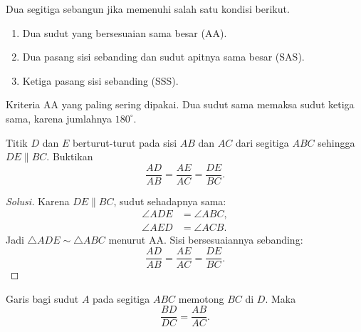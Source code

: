 \documentclass[12pt]{scrartcl}
\begin{document}
\begin{fact}
Dua segitiga sebangun jika memenuhi salah satu kondisi berikut.
\begin{enumerate}
    \item Dua sudut yang bersesuaian sama besar (AA).
    \item Dua pasang sisi sebanding dan sudut apitnya sama besar (SAS).
    \item Ketiga pasang sisi sebanding (SSS).
\end{enumerate}
Kriteria AA yang paling sering dipakai. Dua sudut sama memaksa sudut
ketiga sama, karena jumlahnya $180^\circ$.
\end{fact}

\begin{example}
Titik $D$ dan $E$ berturut-turut pada sisi $AB$ dan $AC$ dari segitiga
$ABC$ sehingga $DE \parallel BC$. Buktikan
\[ \frac{AD}{AB} = \frac{AE}{AC} = \frac{DE}{BC}. \]
\begin{center}
\end{center}
\end{example}
\begin{proof}[Solusi]
Karena $DE \parallel BC$, sudut sehadapnya sama:
\begin{align*}
\angle ADE &= \angle ABC, \\
\angle AED &= \angle ACB.
\end{align*}
Jadi $\triangle ADE \sim \triangle ABC$ menurut AA. Sisi
bersesuaiannya sebanding:
\[ \frac{AD}{AB} = \frac{AE}{AC} = \frac{DE}{BC}. \]
\end{proof}

\begin{theorem}
Garis bagi sudut $A$ pada segitiga $ABC$ memotong $BC$ di $D$. Maka
\[ \frac{BD}{DC} = \frac{AB}{AC}. \]
\end{theorem}
\end{document}
